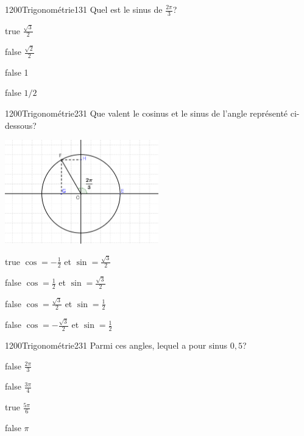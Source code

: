         	\begin{question}{1200}{Trigonométrie}{1}{31}
				Quel est le sinus de $\frac{2\pi}{3}$?
            \end{question}
            \begin{reponses}
            	\item[true] $\frac{\sqrt{3}}{2}$
            	\item[false] $\frac{\sqrt{2}}{2}$
                \item[false] 1
                \item[false] $1/2$
            \end{reponses}
            \begin{question}{1200}{Trigonométrie}{2}{31}
                Que valent le cosinus et le sinus de l'angle représenté ci-dessous?
                \begin{center}
                	\includegraphics[width=0.5\textwidth]{Philippe/Figures_Philippe/trigo_1_4.png}
                \end{center}
            \end{question}
            \begin{reponses}
                \item[true] $\cos = -\frac{1}{2}$ et $\sin = \frac{\sqrt{3}}{2}$
                \item[false] $\cos = \frac{1}{2}$ et $\sin = \frac{\sqrt{3}}{2}$
                \item[false] $\cos = \frac{\sqrt{3}}{2}$ et $\sin = \frac{1}{2}$
                \item[false] $\cos = -\frac{\sqrt{3}}{2}$ et $\sin = \frac{1}{2}$
            \end{reponses}
        	\begin{question}{1200}{Trigonométrie}{2}{31}
				Parmi ces angles, lequel a pour sinus $0,5$?
            \end{question}
            \begin{reponses}
            	\item[false] $\frac{2\pi}{3}$
            	\item[false] $\frac{3\pi}{4}$
                \item[true] $\frac{5\pi}{6}$
                \item[false] $\pi$
            \end{reponses}
